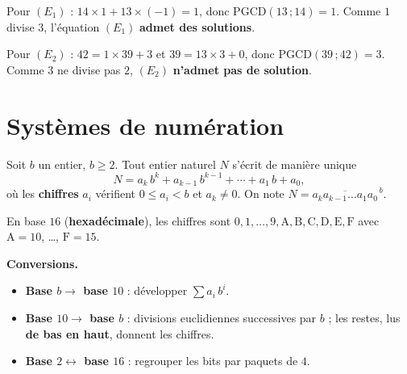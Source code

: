 \solution

Pour $(E_1)$ : $14 \times 1 + 13 \times (-1) = 1$, donc $\mathrm{PGCD}(13\,;14) = 1$.
Comme $1$ divise $3$, l'équation $(E_1)$ \textbf{admet des solutions}.

Pour $(E_2)$ : $42 = 1 \times 39 + 3$ et $39 = 13 \times 3 + 0$, donc
$\mathrm{PGCD}(39\,;42) = 3$. Comme $3$ ne divise pas $2$, $(E_2)$
\textbf{n'admet pas de solution}.

\section{Systèmes de numération}

\begin{definition}
	Soit $b$ un entier, $b \geqslant 2$. Tout entier naturel $N$ s'écrit de
	manière unique
	$$
	N = a_k\,b^k + a_{k-1}\,b^{k-1} + \cdots + a_1\,b + a_0,
	$$
	où les \textbf{chiffres} $a_i$ vérifient $0 \leqslant a_i < b$ et
	$a_k \neq 0$. On note $N = \overline{a_k a_{k-1} \ldots a_1 a_0}^{\,b}$.
\end{definition}

\remarque
En base $16$ (\textbf{hexadécimale}), les chiffres sont
$0,1,\ldots,9,\mathrm{A},\mathrm{B},\mathrm{C},\mathrm{D},\mathrm{E},\mathrm{F}$
avec $\mathrm{A} = 10$, …, $\mathrm{F} = 15$.

\begin{methode}
	\textbf{Conversions.}
	\begin{itemize}[label=\textbullet]
		\item \textbf{Base $b \to$ base $10$} : développer $\sum a_i\,b^i$.
		\item \textbf{Base $10 \to$ base $b$} : divisions euclidiennes
		successives par $b$ ; les restes, lus \textbf{de bas en haut}, donnent
		les chiffres.
		\item \textbf{Base $2 \leftrightarrow$ base $16$} : regrouper les bits
		par paquets de $4$.
	\end{itemize}
\end{methode}

